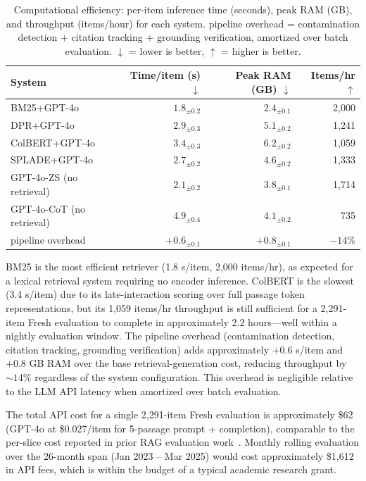\begin{table}[t]
\centering
\small
\caption{Computational efficiency: per-item inference time (seconds), peak RAM (GB), and throughput (items/hour) for each system. \method{} pipeline overhead = contamination detection + citation tracking + grounding verification, amortized over batch evaluation. $\downarrow$ = lower is better, $\uparrow$ = higher is better.}
\label{tab:efficiency}
\begin{tabular}{lrrr}
\toprule
System & Time/item (s) $\downarrow$ & Peak RAM (GB) $\downarrow$ & Items/hr $\uparrow$ \\
\midrule
BM25+GPT-4o    & $1.8_{\pm 0.2}$ & $2.4_{\pm 0.1}$ & 2{,}000 \\
DPR+GPT-4o     & $2.9_{\pm 0.3}$ & $5.1_{\pm 0.2}$ & 1{,}241 \\
ColBERT+GPT-4o & $3.4_{\pm 0.3}$ & $6.2_{\pm 0.2}$ & 1{,}059 \\
SPLADE+GPT-4o  & $2.7_{\pm 0.2}$ & $4.6_{\pm 0.2}$ & 1{,}333 \\
\addlinespace
GPT-4o-ZS (no retrieval) & $2.1_{\pm 0.2}$ & $3.8_{\pm 0.1}$ & 1{,}714 \\
GPT-4o-CoT (no retrieval) & $4.9_{\pm 0.4}$ & $4.1_{\pm 0.2}$ & 735 \\
\addlinespace
\method{} pipeline overhead & $+0.6_{\pm 0.1}$ & $+0.8_{\pm 0.1}$ & $-14\%$ \\
\bottomrule
\end{tabular}
\end{table}

BM25 is the most efficient retriever (1.8 s/item, 2,000 items/hr), as expected for a lexical retrieval system requiring no encoder inference. ColBERT is the slowest (3.4 s/item) due to its late-interaction scoring over full passage token representations, but its 1,059 items/hr throughput is still sufficient for a 2,291-item Fresh evaluation to complete in approximately 2.2 hours---well within a nightly evaluation window. The \method{} pipeline overhead (contamination detection, citation tracking, grounding verification) adds approximately $+0.6$ s/item and $+0.8$ GB RAM over the base retrieval-generation cost, reducing throughput by $\sim14\%$ regardless of the system configuration. This overhead is negligible relative to the LLM API latency when amortized over batch evaluation.

The total API cost for a single 2,291-item Fresh evaluation is approximately \$62 (GPT-4o at \$0.027/item for 5-passage prompt + completion), comparable to the per-slice cost reported in prior RAG evaluation work~\citep{es2023ragas}. Monthly rolling evaluation over the 26-month span (Jan 2023 -- Mar 2025) would cost approximately \$1,612 in API fees, which is within the budget of a typical academic research grant.

